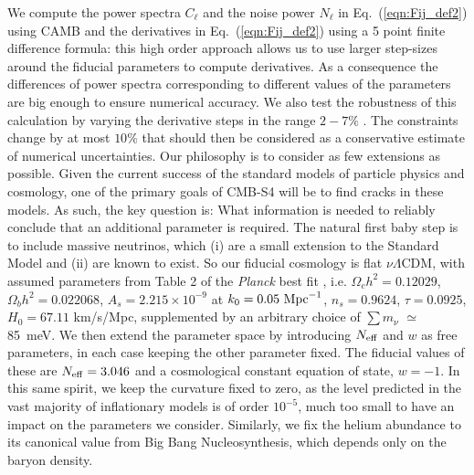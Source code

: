 \documentclass[aps,prd,reprint,superscriptaddress]{revtex4-1}
\newcommand\refeq[1]{Eq.~(\ref{eqn:#1})}
\begin{document}
We compute the power spectra $C_{\ell}$ and the noise power $N_{\ell}$ in \refeq{Fij_def2} using CAMB \cite{Howlett:2012mh,Lewis:1999bs} and
the derivatives in \refeq{Fij_def2} using a 5 point finite difference formula:
this high order approach allows us to use larger step-sizes around the fiducial parameters to compute derivatives. As a consequence the differences of power spectra corresponding to different values of the parameters are big enough to ensure numerical accuracy. We also test the robustness of this calculation by varying the derivative steps in the range $2-7\%$ . The constraints change by at most $10\%$ that should then be considered as a conservative estimate of numerical uncertainties. 
Our philosophy is to consider as few extensions as possible. Given the current success of the standard models of particle physics and cosmology, one of the primary goals of CMB-S4 will be to find cracks in these models. As such, the key question is: What information is needed to reliably conclude that an additional parameter is required. The natural first baby step is to include massive neutrinos, which (i) are a small extension to the Standard Model and (ii) are known to exist. So our fiducial cosmology is flat $\nu \Lambda$CDM, with assumed 
parameters from Table 2 of the \textit{Planck} best fit \cite{planck-collaboration:2014g}, i.e. $\Omega_c h^2 = 0.12029$, $\Omega_b h^2 = 0.022068$, $A_s = 2.215\times10^{-9}$ at $k_0 = 0.05\ {\rm Mpc}^{-1}$, $n_s = 0.9624$, $\tau = 0.0925$, $H_0 = 67.11$ km/s/Mpc, supplemented by an arbitrary choice of $\sum m_\nu$ $\simeq$ 85\ meV.  
We then extend the parameter space by introducing $N_{\rm eff}$ and $w$ as free parameters, in each case keeping the other parameter fixed.
The fiducial values of these are $N_{\rm eff}=3.046$ and a cosmological constant equation of state, $w=-1$. In this same spirit, we keep the curvature fixed to zero, as the level predicted in the vast majority of inflationary models is of order $10^{-5}$, much too small to have an impact on the parameters we consider. Similarly, we fix the helium abundance to its canonical value from Big Bang Nucleosynthesis, which depends only on the baryon density.
\end{document}
